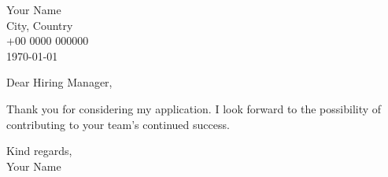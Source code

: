 \documentclass[11pt,a4paper]{letter}
\begin{document}
\setlength{\parskip}{1em} %

\begin{flushright}
Your Name\\
City, Country\\
+00 0000 000000\\
\today
\end{flushright}

Dear Hiring Manager,


Thank you for considering my application. I look forward to the possibility of contributing to your
team’s continued success.

Kind regards,\\
Your Name
\end{document}
